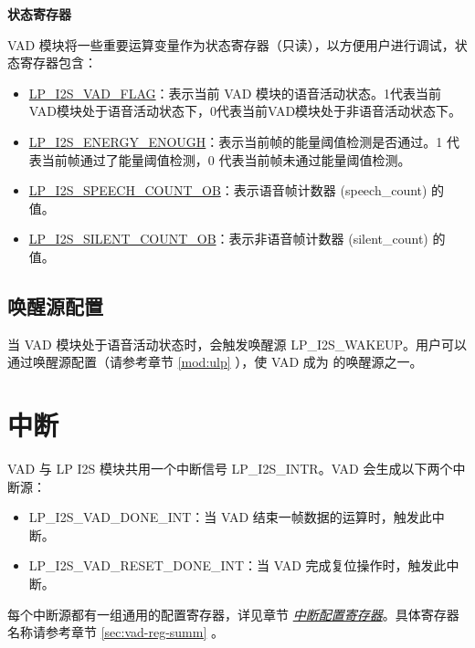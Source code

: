 \documentclass[main\_\_CN.tex]{subfiles}
\begin{document}
\textbf{状态寄存器}

VAD 模块将一些重要运算变量作为状态寄存器（只读），以方便用户进行调试，状态寄存器包含：
\begin{itemize}
    \item \hyperref[fielddesc:LPI2SVADFLAG]{LP\_I2S\_VAD\_FLAG}：表示当前 VAD 模块的语音活动状态。1代表当前VAD模块处于语音活动状态下，0代表当前VAD模块处于非语音活动状态下。
    \item \hyperref[fielddesc:LPI2SENERGYENOUGH]{LP\_I2S\_ENERGY\_ENOUGH}：表示当前帧的能量阈值检测是否通过。1 代表当前帧通过了能量阈值检测，0 代表当前帧未通过能量阈值检测。
    \item \hyperref[fielddesc:LPI2SSPEECHCOUNTOB]{LP\_I2S\_SPEECH\_COUNT\_OB}：表示语音帧计数器 (speech\_count) 的值。
    \item \hyperref[fielddesc:LPI2SSILENTCOUNTOB]{LP\_I2S\_SILENT\_COUNT\_OB}：表示非语音帧计数器 (silent\_count) 的值。
\end{itemize}


\subsection{唤醒源配置}

当 VAD 模块处于语音活动状态时，会触发唤醒源 LP\_I2S\_WAKEUP。用户可以通过唤醒源配置（请参考章节 \ref{mod:ulp} \textit{}），使 VAD 成为 \chipname{} 的唤醒源之一。



\section{中断}

\chipname{} VAD 与 LP I2S 模块共用一个中断信号 LP\_I2S\_INTR。VAD 会生成以下两个中断源：

\begin{itemize}
\item 
\label{int:LPI2SVADDONEINT}LP\_I2S\_VAD\_DONE\_INT：当 VAD 结束一帧数据的运算时，触发此中断。
\item 
\label{int:LPI2SVADRESETDONEINT}LP\_I2S\_VAD\_RESET\_DONE\_INT：当 VAD 完成复位操作时，触发此中断。
\end{itemize}

每个中断源都有一组通用的配置寄存器，详见章节 \hyperref[interrupt-config-registers]{\textit{中断配置寄存器}}。具体寄存器名称请参考章节 \ref{sec:vad-reg-summ} \textit{}。
\end{document}
